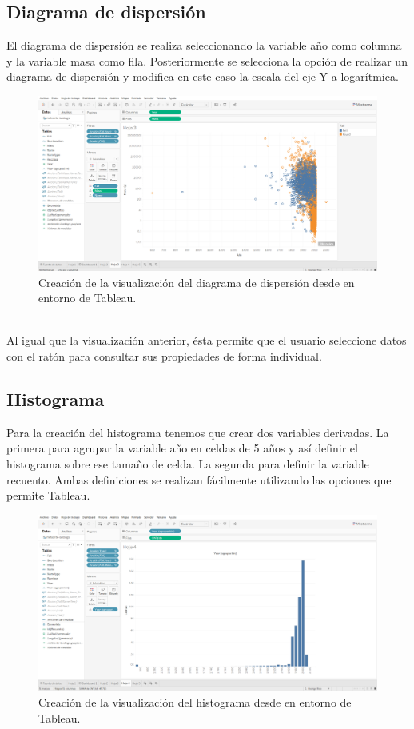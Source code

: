 \documentclass[12pt]{article}
\begin{document}
	\subsection{Diagrama de dispersión}
	El diagrama de dispersión se realiza seleccionando la variable año como columna y la variable masa como fila. Posteriormente se selecciona la opción de realizar un diagrama de dispersión y modifica en este caso la escala del eje Y a logarítmica.\\
	\begin{figure}[h]
		\centering
		\label{Fig:dispersion}
		\includegraphics[width=\textwidth]{Captura de pantalla (64)}
		\caption{Creación de la visualización del diagrama de dispersión desde en entorno de Tableau.}
	\end{figure}
    \\
	Al igual que la visualización anterior, ésta permite que el usuario seleccione datos con el ratón para consultar sus propiedades de forma individual.
	\subsection{Histograma}
	Para la creación del histograma tenemos que crear dos variables derivadas. La primera para agrupar la variable año en celdas de 5 años y así definir el histograma sobre ese tamaño de celda. La segunda para definir la variable recuento. Ambas definiciones se realizan fácilmente utilizando las opciones que permite Tableau.\\
	\begin{figure}[h]
		\centering
		\label{Fig:histograma}
		\includegraphics[width=\textwidth]{Captura de pantalla (65)}
		\caption{Creación de la visualización del histograma desde en entorno de Tableau.}
	\end{figure}
\end{document}
